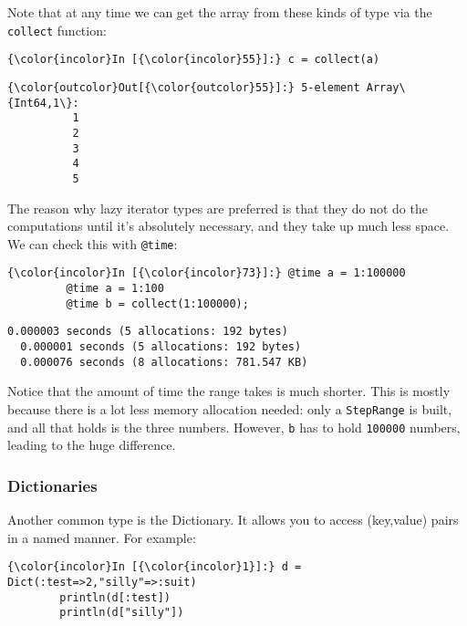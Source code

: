 \documentclass[11pt]{article}
\begin{document}
Note that at any time we can get the array from these kinds of type via
the \texttt{collect} function:

    \begin{Verbatim}[commandchars=\\\{\}]
{\color{incolor}In [{\color{incolor}55}]:} c = collect(a)
\end{Verbatim}

            \begin{Verbatim}[commandchars=\\\{\}]
{\color{outcolor}Out[{\color{outcolor}55}]:} 5-element Array\{Int64,1\}:
          1
          2
          3
          4
          5
\end{Verbatim}
        
    The reason why lazy iterator types are preferred is that they do not do
the computations until it's absolutely necessary, and they take up much
less space. We can check this with \texttt{@time}:

    \begin{Verbatim}[commandchars=\\\{\}]
{\color{incolor}In [{\color{incolor}73}]:} @time a = 1:100000
         @time a = 1:100
         @time b = collect(1:100000);
\end{Verbatim}

    \begin{Verbatim}[commandchars=\\\{\}]
  0.000003 seconds (5 allocations: 192 bytes)
  0.000001 seconds (5 allocations: 192 bytes)
  0.000076 seconds (8 allocations: 781.547 KB)

    \end{Verbatim}

    Notice that the amount of time the range takes is much shorter. This is
mostly because there is a lot less memory allocation needed: only a
\texttt{StepRange} is built, and all that holds is the three numbers.
However, \texttt{b} has to hold \texttt{100000} numbers, leading to the
huge difference.

\subsubsection{Dictionaries}\label{dictionaries}

Another common type is the Dictionary. It allows you to access
(key,value) pairs in a named manner. For example:

    \begin{Verbatim}[commandchars=\\\{\}]
{\color{incolor}In [{\color{incolor}1}]:} d = Dict(:test=>2,"silly"=>:suit)
        println(d[:test])
        println(d["silly"])
\end{Verbatim}
\end{document}
